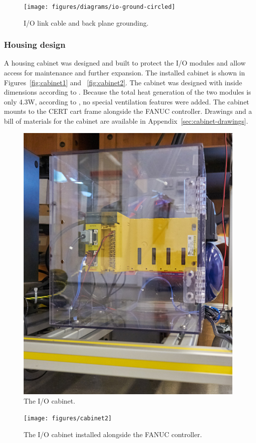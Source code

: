 \begin{figure}
    \centering
    \texttt{[image: figures/diagrams/io-ground-circled]}
    \caption{I/O link cable and back plane grounding.}
    \label{fig:io-ground}
\end{figure}

\subsubsection{Housing design}
A housing cabinet was designed and built to protect the I/O modules and allow access for maintenance and further expansion. The installed cabinet is shown in Figures~\ref{fig:cabinet1} and ~\ref{fig:cabinet2}. The cabinet was designed with inside dimensions according to \cite[sec~3.2]{io-unit}. Because the total heat generation of the two modules is only 4.3W, according to \cite[Table~3.3]{io-unit}, no special ventilation features were added. The cabinet mounts to the CERT cart frame alongside the FANUC controller. Drawings and a bill of materials for the cabinet are available in Appendix~\ref{sec:cabinet-drawings}.

\begin{figure}
    \centering
    \includegraphics[width=.5\linewidth]{figures/cabinet1}
    \caption{The I/O cabinet.}
    \label{fig:cabinet-1}
    \end{figure}

\begin{figure}
    \centering
    \texttt{[image: figures/cabinet2]}
    \caption{The I/O cabinet installed alongside the FANUC controller.}
    \label{fig:cabinet-2}
\end{figure}

